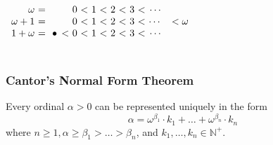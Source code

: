 \documentclass[UTF8,11pt,colorlinks,compress,openany]{beamer}%
\begin{document}
\begin{frame}
\begin{columns}
{\begin{minipage}{\textwidth}
					\[\begin{array}{r@{\ =\ \ }cc@{\ <\ }c@{\ <\ }c@{\ <\ }c@{\ <\ }cc}
					\omega & & 0 & 1 & 2 & 3 & \cdots\\
					\omega+1 & & 0 & 1 & 2 & 3 & \cdots & 
					< \omega\\
					1+\omega & \bullet\,<\!\!\!\!& 0 & 1 & 2 & 3 & \cdots
					\end{array}\]
			\end{minipage}}
	\end{columns}
\end{frame}

\begin{frame}\frametitle{Cantor's Normal Form Theorem}
	\begin{theorem}
		Every ordinal $\alpha>0$ can be represented uniquely in the form
		\[\alpha=\omega^{\beta_1}\cdot k_1+\dots+\omega^{\beta_n}\cdot k_n\]
		where $n\geq 1, \alpha\geq\beta_1>\dots>\beta_n$, and $k_1,\dots,k_n\in\mathbb{N}^+$.
	\end{theorem}
\end{frame}
\end{document}
